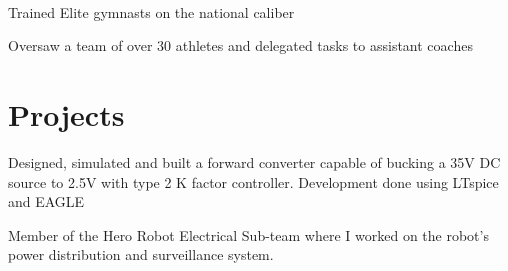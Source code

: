 \documentclass[]{hieudo-build}
\begin{document}
\begin{minipage}[t]{0.70\textwidth}
 \\
\begin{tightemize}
\item Trained Elite gymnasts on the national caliber
\item Oversaw a team of over 30 athletes and delegated tasks to assistant coaches
\end{tightemize}
\sectionsep

\section{Projects}
\descript{}
Designed, simulated and built a forward converter capable of
bucking a 35V DC source to 2.5V with type 2 K factor controller. Development done using LTspice and EAGLE 
\sectionsep

\descript{}
Member of the Hero Robot Electrical Sub-team where I worked on the robot's power distribution and surveillance system.  
\sectionsep 

\end{minipage} 
\end{document}
